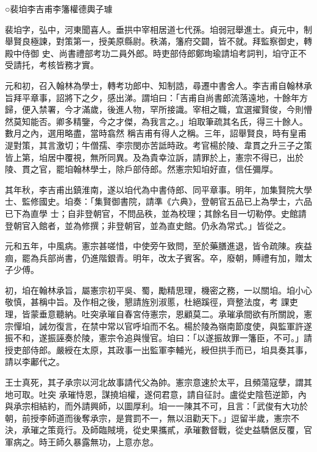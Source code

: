 
\begin{pinyinscope}

 ○裴垍李吉甫李籓權德輿子璩



 裴垍字，弘中，河東聞喜人。垂拱中宰相居道七代孫。垍弱冠舉進士。貞元中，制舉賢良極諫，對策第一，授美原縣尉。秩滿，籓府交闢，皆不就。拜監察御史，轉殿中侍御
 史、尚書禮部考功二員外郎。時吏部侍郎鄭珣瑜請垍考詞判，垍守正不受請托，考核皆務才實。



 元和初，召入翰林為學士，轉考功郎中、知制誥，尋遷中書舍人。李吉甫自翰林承旨拜平章事，詔將下之夕，感出涕。謂垍曰：「吉甫自尚書郎流落遠地，十餘年方歸，便入禁署，今才滿歲，後進人物，罕所接識。宰相之職，宜選擢賢俊，今則懵然莫知能否。卿多精鑒，今之才傑，為我言之。」垍取筆疏其名氏，得三十餘人。數月之內，選用略盡，當時翕然
 稱吉甫有得人之稱。三年，詔舉賢良，時有皇甫湜對策，其言激切；牛僧孺、李宗閔亦苦詆時政。考官楊於陵、韋貫之升三子之策皆上第，垍居中覆視，無所同異。及為貴幸泣訴，請罪於上，憲宗不得已，出於陵、貫之官，罷垍翰林學士，除戶部侍郎。然憲宗知垍好直，信任彌厚。



 其年秋，李吉甫出鎮淮南，遂以垍代為中書侍郎、同平章事。明年，加集賢院大學士、監修國史。垍奏：「集賢御書院，請準《六典》，登朝官五品已上為學士，六品已下為直學
 士；自非登朝官，不問品秩，並為校理；其餘名目一切勒停。史館請登朝官入館者，並為修撰；非登朝官，並為直史館。仍永為常式。」皆從之。



 元和五年，中風病。憲宗甚嗟惜，中使旁午致問，至於藥膳進退，皆令疏陳。疾益痼，罷為兵部尚書，仍進階銀青。明年，改太子賓客。卒，廢朝，賻禮有加，贈太子少傅。



 初，垍在翰林承旨，屬憲宗初平吳、蜀，勵精思理，機密之務，一以關垍。垍小心敬慎，甚稱中旨。及作相之後，懇請旌別淑慝，杜絕蹊徑，齊整法度，考
 課吏理，皆蒙垂意聽納。吐突承璀自春宮侍憲宗，恩顧莫二。承璀承間欲有所關說，憲宗憚垍，誡勿復言，在禁中常以官呼垍而不名。楊於陵為嶺南節度使，與監軍許遂振不和，遂振誣奏於陵，憲宗令追與慢官。垍曰：「以遂振故罪一籓臣，不可。」請授吏部侍郎。嚴綬在太原，其政事一出監軍李輔光，綬但拱手而已，垍具奏其事，請以李鄘代之。



 王士真死，其子承宗以河北故事請代父為帥。憲宗意速於太平，且頻蕩寇孽，謂其地可取。吐突
 承璀恃恩，謀撓垍權，遂伺君意，請自征討。盧從史陰苞逆節，內與承宗相結約，而外請興師，以圖厚利。垍一一陳其不可，且言：「武俊有大功於朝，前授李師道而後奪承宗，是賞罰不一，無以沮勸天下。」逗留半歲，憲宗不決，承璀之策竟行。及師臨賊境，從史果攜貳，承璀數督戰，從史益驕倨反覆，官軍病之。時王師久暴露無功，上意亦怠。




\end{pinyinscope}

